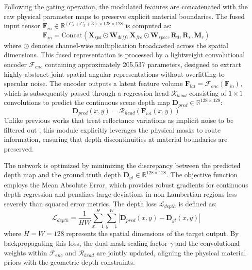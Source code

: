 \documentclass[lettersize,journal]{IEEEtran}
\begin{document}
Following the gating operation, the modulated features are concatenated with the raw physical parameter maps to preserve explicit material boundaries. The fused input tensor $\mathbf{F}_{in} \in \mathbb{R}^{(C_s + C_f + 3) \times 128 \times 128}$ is computed as:
\begin{equation}
\mathbf{F}_{in} = \mathrm{Concat}\left( \mathbf{X}_{spa} \odot \mathbf{W}_{diff}, \mathbf{X}_{fre} \odot \mathbf{W}_{spec}, \mathbf{R}_d, \mathbf{R}_s, \mathbf{M}_r \right)
\end{equation}
where $\odot$ denotes channel-wise multiplication broadcasted across the spatial dimensions. This fused representation is processed by a lightweight convolutional encoder $\mathcal{F}_{enc}$ containing approximately 205,537 parameters, designed to extract highly abstract joint spatial-angular representations without overfitting to specular noise. The encoder outputs a latent feature volume $\mathbf{F}_{lat} = \mathcal{F}_{enc}(\mathbf{F}_{in})$, which is subsequently passed through a regression head $\mathcal{R}_{head}$ consisting of $1 \times 1$ convolutions to predict the continuous scene depth map $\mathbf{D}_{pred} \in \mathbb{R}^{128 \times 128}$:
\begin{equation}
\mathbf{D}_{pred}(x,y) = \mathcal{R}_{head}\left( \mathbf{F}_{lat}(x,y) \right)
\end{equation}
Unlike previous works that treat reflectance variations as implicit noise to be filtered out \cite{lyu2022}, this module explicitly leverages the physical masks to route information, ensuring that depth discontinuities at material boundaries are preserved.

The network is optimized by minimizing the discrepancy between the predicted depth map and the ground truth depth $\mathbf{D}_{gt} \in \mathbb{R}^{128 \times 128}$. The objective function employs the Mean Absolute Error, which provides robust gradients for continuous depth regression and penalizes large deviations in non-Lambertian regions less severely than squared error metrics. The depth loss $\mathcal{L}_{depth}$ is defined as:
\begin{equation}
\mathcal{L}_{depth} = \frac{1}{H W} \sum_{x=1}^{H} \sum_{y=1}^{W} \left| \mathbf{D}_{pred}(x,y) - \mathbf{D}_{gt}(x,y) \right|
\end{equation}
where $H = W = 128$ represents the spatial dimensions of the target output. By backpropagating this loss, the dual-mask scaling factor $\gamma$ and the convolutional weights within $\mathcal{F}_{enc}$ and $\mathcal{R}_{head}$ are jointly updated, aligning the physical material priors with the geometric depth constraints.
\end{document}
